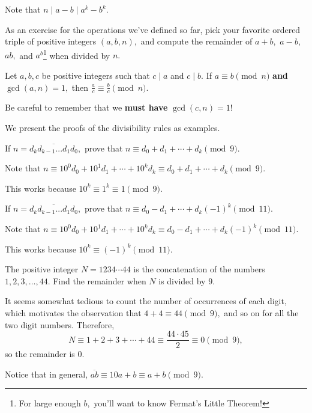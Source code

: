 \documentclass{article}
\begin{document}
\begin{pro}
Note that $n\mid a-b\mid a^k-b^k.$
\end{pro}

As an exercise for the operations we've defined so far, pick your favorite ordered triple of positive integers $(a,b,n),$ and compute the remainder of $a+b,$ $a-b,$ $ab,$ and $a^b$\footnote{For large enough $b,$ you'll want to know Fermat's Little Theorem!} when divided by $n.$

\begin{fact}[Dividing]
Let $a,b,c$ be positive integers such that $c\mid a$ and $c\mid b.$ If $a\equiv b\pmod{n}$ \textbf{and} $\gcd(a,n)=1,$ then $\frac{a}{c}\equiv\frac{b}{c}\pmod{n}.$
\end{fact}

Be careful to remember that we \textbf{must have} $\gcd(c,n)=1$!

We present the proofs of the divisibility rules as examples.

\begin{exam}
If $n=\overline{d_{k}d_{k-1}...d_{1}d_{0}},$ prove that $n\equiv d_0+d_1+\cdots+d_{k}\pmod{9}.$
\end{exam}

\begin{sol}
Note that $n\equiv 10^0d_0+10^1d_1+\cdots+10^{k}d_{k}\equiv d_0+d_1+\cdots+d_k\pmod{9}.$

This works because $10^k\equiv 1^k\equiv 1\pmod{9}.$
\end{sol}

\begin{exam}
If $n=\overline{d_{k}d_{k-1}...d_{1}d_{0}},$ prove that $n\equiv d_0-d_1+\cdots+d_{k}(-1)^k\pmod{11}.$
\end{exam}

\begin{sol}
Note that $n\equiv 10^0d_0+10^1d_1+\cdots+10^{k}d_{k}\equiv d_0-d_1+\cdots+d_k(-1)^k\pmod{11}.$

This works because $10^k\equiv (-1)^k\pmod{11}.$
\end{sol}

\begin{exam}
The positive integer $N=1234\cdots44$ is the concatenation of the numbers $1,2,3,\ldots,44.$ Find the remainder when $N$ is divided by $9.$
\end{exam}

\begin{sol}
It seems somewhat tedious to count the number of occurrences of each digit, which motivates the observation that $4+4\equiv 44\pmod{9},$ and so on for all the two digit numbers. Therefore,
\[N\equiv 1+2+3+\cdots+44\equiv\frac{44\cdot 45}{2}\equiv 0\pmod{9},\]
so the remainder is $0.$
\end{sol}
Notice that in general, $\overline{ab}\equiv 10a+b\equiv a+b\pmod{9}.$
\end{document}
